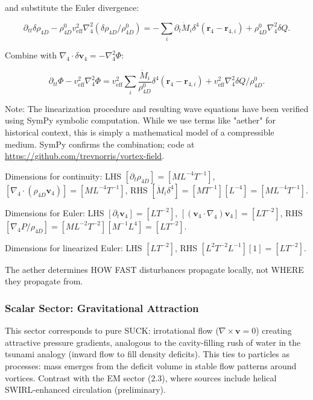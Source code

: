 and substitute the Euler divergence:

\begin{equation}
\partial_{tt} \delta \rho_{4D} - \rho_{4D}^0 v_{\text{eff}}^2 \nabla_4^2 (\delta \rho_{4D} / \rho_{4D}^0) = -\sum_i \partial_t \dot{M}_i \delta^4(\mathbf{r}_4 - \mathbf{r}_{4,i}) + \rho_{4D}^0 \nabla_4^2 \delta Q.
\end{equation}

Combine with $\nabla_4 \cdot \delta \mathbf{v}_4 = -\nabla_4^2 \Phi$:

\begin{equation}
\partial_{tt} \Phi - v_{\text{eff}}^2 \nabla_4^2 \Phi = v_{\text{eff}}^2 \sum_i \frac{\dot{M}_i}{\rho_{4D}^0} \delta^4(\mathbf{r}_4 - \mathbf{r}_{4,i}) + v_{\text{eff}}^2 \nabla_4^2 \delta Q / \rho_{4D}^0.
\end{equation}

Note: The linearization procedure and resulting wave equations have been verified using SymPy symbolic computation. While we use terms like "aether" for historical context, this is simply a mathematical model of a compressible medium. SymPy confirms the combination; code at \url{https://github.com/trevnorris/vortex-field}.

\begin{tcolorbox}[title=Dimensional Checks]
Dimensions for continuity: LHS $[\partial_t \rho_{4D}] = [M L^{-4} T^{-1}]$, $[\nabla_4 \cdot (\rho_{4D} \mathbf{v}_4)] = [M L^{-4} T^{-1}]$, RHS $[\dot{M}_i \delta^4] = [M T^{-1}] [L^{-4}] = [M L^{-4} T^{-1}]$.

Dimensions for Euler: LHS $[\partial_t \mathbf{v}_4] = [L T^{-2}]$, $[(\mathbf{v}_4 \cdot \nabla_4) \mathbf{v}_4] = [L T^{-2}]$, RHS $[\nabla_4 P / \rho_{4D}] = [M L^{-2} T^{-2}] [M^{-1} L^{4}] = [L T^{-2}]$.

Dimensions for linearized Euler: LHS $[L T^{-2}]$, RHS $[L^2 T^{-2} L^{-1}] [1] = [L T^{-2}]$.
\end{tcolorbox}

\begin{tcolorbox}
The aether determines HOW FAST disturbances propagate locally, not WHERE they propagate from.
\end{tcolorbox}

\subsubsection{Scalar Sector: Gravitational Attraction}

This sector corresponds to pure SUCK: irrotational flow ($\nabla \times \mathbf{v} = 0$) creating attractive pressure gradients, analogous to the cavity-filling rush of water in the tsunami analogy (inward flow to fill density deficits). This ties to particles as processes: mass emerges from the deficit volume in stable flow patterns around vortices. Contrast with the EM sector (2.3), where sources include helical SWIRL-enhanced circulation (preliminary).


